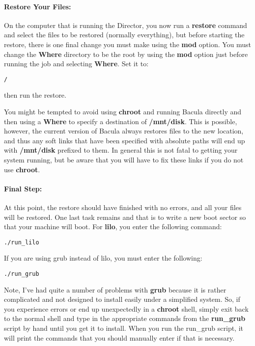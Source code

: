 \paragraph*{Restore Your Files:}

On the computer that is running the Director, you now run a {\bf restore}
command and select the files to be restored (normally everything), but before
starting the restore, there is one final change you must make using the {\bf
mod} option. You must change the {\bf Where} directory to be the root by using
the {\bf mod} option just before running the job and selecting {\bf Where}.
Set it to: 

\footnotesize
\begin{verbatim}
/
\end{verbatim}
\normalsize

then run the restore. 

You might be tempted to avoid using {\bf chroot} and running Bacula directly
and then using a {\bf Where} to specify a destination of {\bf /mnt/disk}. This
is possible, however, the current version of Bacula always restores files to
the new location, and thus any soft links that have been specified with
absolute paths will end up with {\bf /mnt/disk} prefixed to them. In general
this is not fatal to getting your system running, but be aware that you will
have to fix these links if you do not use {\bf chroot}. 

\paragraph*{Final Step:}

At this point, the restore should have finished with no errors, and all your
files will be restored. One last task remains and that is to write a new boot
sector so that your machine will boot. For {\bf lilo}, you enter the following
command: 

\footnotesize
\begin{verbatim}
./run_lilo
\end{verbatim}
\normalsize

If you are using grub instead of lilo, you must enter the following: 

\footnotesize
\begin{verbatim}
./run_grub
\end{verbatim}
\normalsize

Note, I've had quite a number of problems with {\bf grub} because it is rather
complicated and not designed to install easily under a simplified system. So,
if you experience errors or end up unexpectedly in a {\bf chroot} shell,
simply exit back to the normal shell and type in the appropriate commands from
the {\bf run\_grub} script by hand until you get it to install. When you run
the run\_grub script, it will print the commands that you should manually
enter if that is necessary. 

